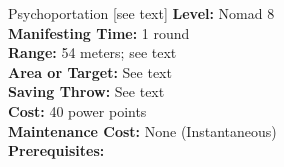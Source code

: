 {Psychoportation [see text]}
{
	\textbf{Level:}
	Nomad 8\\
	\textbf{Manifesting Time:}
	1 round\\
	\textbf{Range:}
	54 meters; see text\\
	\textbf{Area or Target:}
	See text\\
	\textbf{Saving Throw:}
	See text\\
	\textbf{Cost:}
	40 power points\\
	\textbf{Maintenance Cost:}
	None (Instantaneous)\\
	\textbf{Prerequisites:}
	\\
}
